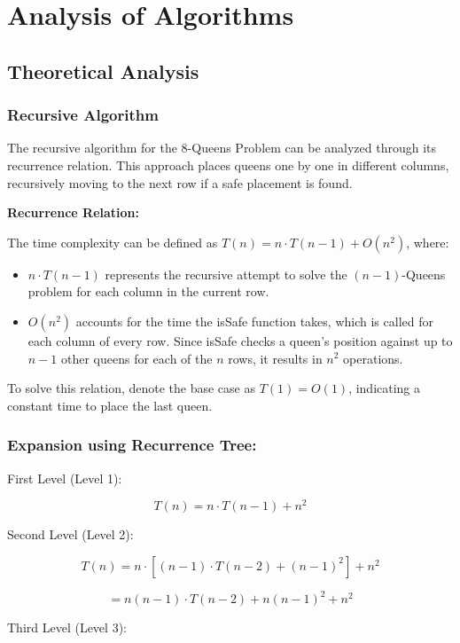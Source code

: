 \documentclass{article}
\begin{document}
\section*{Analysis of Algorithms}

\subsection*{Theoretical Analysis}

\subsubsection*{Recursive Algorithm}
The recursive algorithm for the 8-Queens Problem can be analyzed through its recurrence relation. This approach places queens one by one in different columns, recursively moving to the next row if a safe placement is found.

\textbf{Recurrence Relation:}

The time complexity can be defined as \(T(n) = n \cdot T(n-1) + O(n^2)\), where:

\begin{itemize}
\item \(n \cdot T(n-1)\) represents the recursive attempt to solve the \((n-1)\)-Queens problem for each column in the current row.

\item \(O(n^2)\) accounts for the time the isSafe function takes, which is called for each column of every row. Since isSafe checks a queen's position against up to \(n-1\) other queens for each of the \(n\) rows, it results in \(n^2\) operations.
\end{itemize}

To solve this relation, denote the base case as \(T(1) = O(1)\), indicating a constant time to place the last queen.

\subsubsection*{Expansion using Recurrence Tree:}

First Level (Level 1):

\[T(n) = n \cdot T(n-1) + n^2\]

Second Level (Level 2):

\[T(n) = n \cdot [(n-1) \cdot T(n-2) + (n-1)^2] + n^2\]

\[= n(n-1) \cdot T(n-2) + n(n-1)^2 + n^2\]

Third Level (Level 3):
\end{document}
